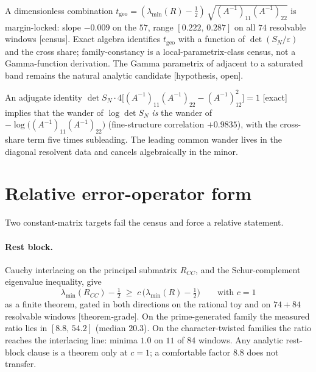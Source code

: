 \documentclass[11pt]{article}
\theoremstyle{remark}
\newcommand{\half}{\tfrac12}
\newcommand{\gr}[1]{\textnormal{\small[#1]}}
\begin{document}
A dimensionless combination
$t_{\mathrm{geo}}
=(\lambda_{\min}(R)-\half)\,
\sqrt{(A^{-1})_{11}(A^{-1})_{22}}$
is margin-locked: slope $-0.009$ on the $57$, range
$[0.222,\,0.287]$ on all $74$ resolvable windows \gr{census}.  Exact
algebra identifies $t_{\mathrm{geo}}$ with a function of
$\det(S_{N}/\varepsilon)$ and the cross share; family-constancy is a
local-parametrix-class census, not a Gamma-function derivation.
The Gamma parametrix of \cite[Thm~2.7, Rem~2.8]{BKMM2007} adjacent
to a saturated band remains the natural analytic candidate
\gr{hypothesis, open}.

An adjugate identity
$\det S_{N}\cdot 4\bigl[(A^{-1})_{11}(A^{-1})_{22}-(A^{-1})_{12}^{2}\bigr]
=1$
\gr{exact} implies that the wander of $\log\det S_{N}$ \emph{is}
the wander of $-\log\bigl((A^{-1})_{11}(A^{-1})_{22}\bigr)$
(fine-structure correlation $+0.9835$), with the cross-share term
five times subleading.  The leading common wander lives in the
diagonal resolvent data and cancels algebraically in the minor.

\section{Relative error-operator form}\label{sec:error}

Two constant-matrix targets fail the census and force a relative
statement.

\paragraph{Rest block.}
Cauchy interlacing on the principal submatrix $R_{CC}$, and the
Schur-complement eigenvalue inequality, give
\begin{equation}\label{eq:rest}
\lambda_{\min}(R_{CC})-\half
\;\ge\;
c\,\bigl(\lambda_{\min}(R)-\half\bigr)
\qquad\text{with }c=1
\end{equation}
as a finite theorem, gated in both directions on the rational toy
and on $74+84$ resolvable windows \gr{theorem-grade}.  On the
prime-generated family the measured ratio lies in $[8.8,\,54.2]$
(median $20.3$).  On the character-twisted families the ratio
reaches the interlacing line: minima $1.0$ on $11$ of $84$ windows.
Any analytic rest-block clause is a theorem only at $c=1$; a
comfortable factor $8.8$ does not transfer.
\end{document}

